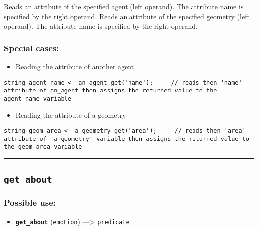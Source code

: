 \documentclass[]{book}
\providecommand{\tightlist}{%
  \setlength{\itemsep}{0pt}\setlength{\parskip}{0pt}}
\theoremstyle{definition}
\theoremstyle{definition}
\theoremstyle{definition}
\theoremstyle{remark}
\begin{document}
Reads an attribute of the specified agent (left operand). The attribute
name is specified by the right operand. Reads an attribute of the
specified geometry (left operand). The attribute name is specified by
the right operand.

\subsubsection{Special cases:}\label{special-cases-71}

\begin{itemize}
\tightlist
\item
  Reading the attribute of another agent
\end{itemize}

\begin{verbatim}
string agent_name <- an_agent get('name');     // reads then 'name' attribute of an_agent then assigns the returned value to the agent_name variable 
\end{verbatim}

\begin{itemize}
\tightlist
\item
  Reading the attribute of a geometry
\end{itemize}

\begin{verbatim}
string geom_area <- a_geometry get('area');     // reads then 'area' attribute of 'a_geometry' variable then assigns the returned value to the geom_area variable 
\end{verbatim}

\begin{center}\rule{0.5\linewidth}{\linethickness}\end{center}

\subsection{\texorpdfstring{\texttt{get\_about}}{get\_about}}\label{get_about}

\subsubsection{Possible use:}\label{possible-use-194}

\begin{itemize}
\tightlist
\item
  \textbf{\texttt{get\_about}} (\texttt{emotion}) ---\textgreater{}
  \texttt{predicate}
\end{itemize}
\end{document}
